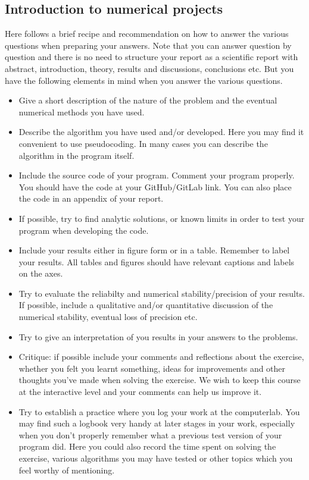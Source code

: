 \documentclass[%
oneside,                 %
final,                   %
10pt]{article}
\begin{document}
\noindent
\subsection{Introduction to numerical projects}

Here follows a brief recipe and recommendation on how to answer the various questions when preparing your answers. Note that you can answer question by question and there is no need to structure your report as a scientific report with abstract, introduction, theory, results and discussions, conclusions etc. But you have the following elements in mind when you answer the various questions.


\begin{itemize}
  \item Give a short description of the nature of the problem and the eventual  numerical methods you have used.

  \item Describe the algorithm you have used and/or developed. Here you may find it convenient to use pseudocoding. In many cases you can describe the algorithm in the program itself.

  \item Include the source code of your program. Comment your program properly. You should have the code at your GitHub/GitLab link. You can also place the code in an appendix of your report.

  \item If possible, try to find analytic solutions, or known limits in order to test your program when developing the code.

  \item Include your results either in figure form or in a table. Remember to        label your results. All tables and figures should have relevant captions        and labels on the axes.

  \item Try to evaluate the reliabilty and numerical stability/precision of your results. If possible, include a qualitative and/or quantitative discussion of the numerical stability, eventual loss of precision etc.

  \item Try to give an interpretation of you results in your answers to  the problems.

  \item Critique: if possible include your comments and reflections about the  exercise, whether you felt you learnt something, ideas for improvements and  other thoughts you've made when solving the exercise. We wish to keep this course at the interactive level and your comments can help us improve it.

  \item Try to establish a practice where you log your work at the  computerlab. You may find such a logbook very handy at later stages in your work, especially when you don't properly remember  what a previous test version  of your program did. Here you could also record  the time spent on solving the exercise, various algorithms you may have tested or other topics which you feel worthy of mentioning.
\end{itemize}
\end{document}
